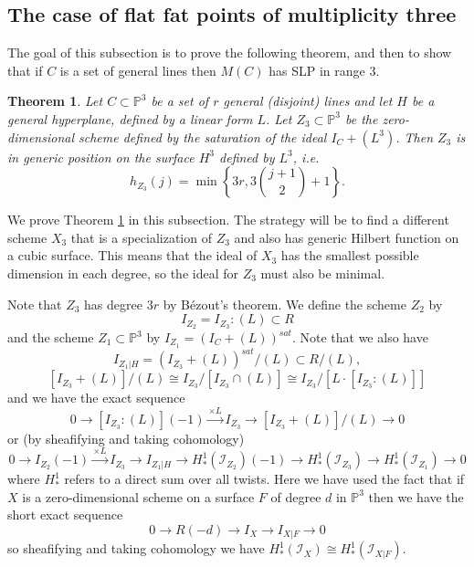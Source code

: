 \documentclass[12pt]{amsart}%
\numberwithin{equation}{section}
\newtheorem{theorem}{Theorem}[section]
\theoremstyle{definition}
\numberwithin{equation}{section}
\newcommand{\PP}{ \ensuremath{\mathbb{P}}}
\begin{document}

\subsection{The case of flat fat points of multiplicity three}

The goal of this subsection is to prove the following theorem, and then to show that if $C$ is a set of general lines then $M(C)$ has SLP in range 3.

\begin{theorem} \label{Z3}
Let $C \subset \PP^3$ be a set of $r$ general (disjoint) lines and let $H$ be a general hyperplane, defined by a linear form $L$. Let $Z_3 \subset \PP^3$ be the zero-dimensional scheme defined by the saturation of the ideal $I_C + (L^3)$. Then $Z_3$ is in generic position on the surface $H^3$ defined by $L^3$, {i.e. 
\[
h_{Z_3} (j) = \min \left\{3 r, 3 \binom{j+1}{2} +1 \right\}. 
\]
} 
\end{theorem}

We prove Theorem \ref{Z3} in this subsection. The strategy will be to find a different scheme $X_3$ that is a specialization of $Z_3$ and also has generic Hilbert function on a cubic surface. This means that the ideal of $X_3$ has the smallest possible dimension in each degree, so the ideal for $Z_3$ must also be minimal.

Note that $Z_3$ has degree $3r$ by B\'ezout's theorem. We define the scheme $Z_2$ by
\[
I_{Z_2}  =  I_{Z_3} : (L) \subset R
\]
and the scheme $Z_1 \subset \PP^3$ by $I_{Z_1} = (I_C + (L))^{sat}$. 
Note that we also have 
\[
I_{Z_1 |H}  =  (I_{Z_3} + (L))^{sat}/(L) \subset R/(L) ,
\]
\[
 [I_{Z_3} + (L)]/(L) \cong I_{Z_3} / [I_{Z_3} \cap (L)] \cong  I_{Z_3} / [L \cdot [I_{Z_3} : (L) ]]
\]
and we have the exact sequence
\[
0 \rightarrow [I_{Z_3} : (L)](-1) \stackrel{\times L}{\longrightarrow} I_{Z_3} \rightarrow [I_{Z_3} + (L)]/(L) \rightarrow 0
\]
or (by sheafifying and taking cohomology)
\begin{equation}\label{exact seq fat3}
0 \rightarrow I_{Z_2}(-1) \stackrel{\times L}{\longrightarrow} I_{Z_3} \rightarrow I_{Z_1 |H} \rightarrow H^1_*(\mathcal I_{Z_2})(-1) \rightarrow H^1_* (\mathcal I_{Z_3}) \rightarrow H^1_* (\mathcal I_{Z_1}) \rightarrow 0
\end{equation}
where $H^1_*$ refers to a direct sum over all twists. Here we have used the fact that if $X$ is a zero-dimensional scheme on a surface $F$ of degree $d$  in $\PP^3$ then we have the short exact sequence
\[
0 \rightarrow R(-d) \rightarrow I_X \rightarrow I_{X|F} \rightarrow 0
\]
so sheafifying and taking cohomology we have $H^1_*(\mathcal I_X) \cong H^1_*(\mathcal I_{X|F})$.
\end{document}
